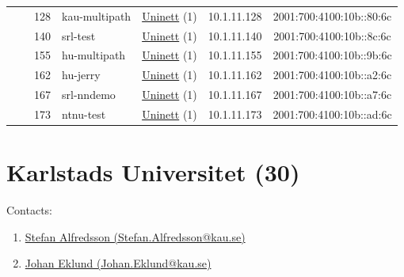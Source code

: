 \begin{small}
\begin{center}
\begin{longtable}{|c|c|c|c|c|c|c|c|}
  &  & \tiny{128} & \multicolumn{1}{|l|}{\tiny{kau-multipath}} & \multicolumn{2}{|c|}{\tiny{\href{https://www.uninett.no}{Uninett} (1)}} & \tiny{10.1.11.128} & \tiny{2001:700:4100:10b::80:6c} \\* \cline{3-3}\cline{4-4}\cline{5-5}\cline{6-6}\cline{7-7}\cline{8-8}
  &  & \tiny{140} & \multicolumn{1}{|l|}{\tiny{srl-test}} & \multicolumn{2}{|c|}{\tiny{\href{https://www.uninett.no}{Uninett} (1)}} & \tiny{10.1.11.140} & \tiny{2001:700:4100:10b::8c:6c} \\* \cline{3-3}\cline{4-4}\cline{5-5}\cline{6-6}\cline{7-7}\cline{8-8}
  &  & \tiny{155} & \multicolumn{1}{|l|}{\tiny{hu-multipath}} & \multicolumn{2}{|c|}{\tiny{\href{https://www.uninett.no}{Uninett} (1)}} & \tiny{10.1.11.155} & \tiny{2001:700:4100:10b::9b:6c} \\* \cline{3-3}\cline{4-4}\cline{5-5}\cline{6-6}\cline{7-7}\cline{8-8}
  &  & \tiny{162} & \multicolumn{1}{|l|}{\tiny{hu-jerry}} & \multicolumn{2}{|c|}{\tiny{\href{https://www.uninett.no}{Uninett} (1)}} & \tiny{10.1.11.162} & \tiny{2001:700:4100:10b::a2:6c} \\* \cline{3-3}\cline{4-4}\cline{5-5}\cline{6-6}\cline{7-7}\cline{8-8}
  &  & \tiny{167} & \multicolumn{1}{|l|}{\tiny{srl-nndemo}} & \multicolumn{2}{|c|}{\tiny{\href{https://www.uninett.no}{Uninett} (1)}} & \tiny{10.1.11.167} & \tiny{2001:700:4100:10b::a7:6c} \\* \cline{3-3}\cline{4-4}\cline{5-5}\cline{6-6}\cline{7-7}\cline{8-8}
  &  & \tiny{173} & \multicolumn{1}{|l|}{\tiny{ntnu-test}} & \multicolumn{2}{|c|}{\tiny{\href{https://www.uninett.no}{Uninett} (1)}} & \tiny{10.1.11.173} & \tiny{2001:700:4100:10b::ad:6c} \\ \hline
\end{longtable}
\end{center}
\end{small}



\section{Karlstads Universitet (30)}
\label{sec:KAU}

Contacts:
\begin{enumerate}
 \item {}\href{mailto:Stefan.Alfredsson@kau.se}{Stefan Alfredsson (Stefan.Alfredsson@kau.se)}
 \item {}\href{mailto:Johan.Eklund@kau.se}{Johan Eklund (Johan.Eklund@kau.se)}
\end{enumerate}

